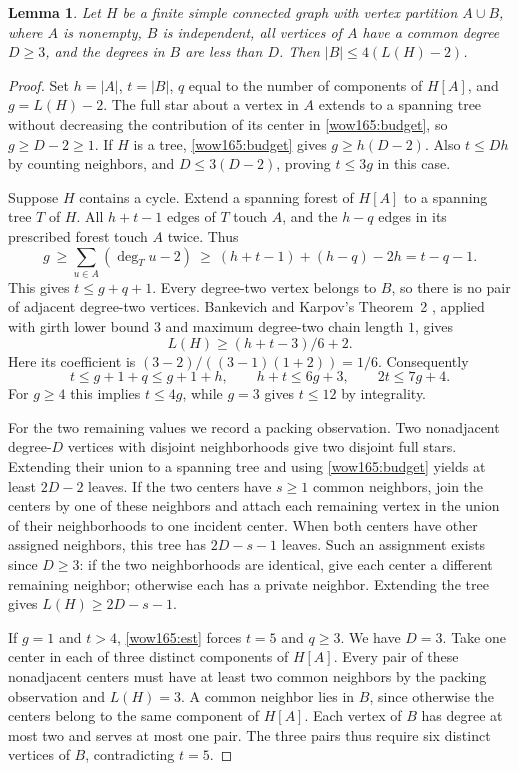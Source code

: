 \documentclass[11pt,a4paper]{article}
\newtheorem{lemma}[theorem]{Lemma}
\numberwithin{equation}{section}
\begin{document}
\begin{lemma}\label{wow165:component}
Let $H$ be a finite simple connected graph with vertex partition
$A\cup B$, where $A$ is nonempty, $B$ is independent, all vertices of
$A$ have a common degree $D\ge3$, and the degrees in $B$ are less than
$D$. Then $|B|\le4(L(H)-2)$.
\end{lemma}
\begin{proof}
Set $h=|A|$, $t=|B|$, $q$ equal to the number of components of $H[A]$,
and $g=L(H)-2$. The full star about a vertex in $A$ extends to a spanning
tree without decreasing the contribution of its center in
\eqref{wow165:budget}, so $g\ge D-2\ge1$. If $H$ is a tree,
\eqref{wow165:budget} gives $g\ge h(D-2)$. Also $t\le Dh$ by counting
neighbors, and $D\le3(D-2)$, proving $t\le3g$ in this case.

Suppose $H$ contains a cycle. Extend a spanning forest of $H[A]$ to
a spanning tree $T$ of $H$. All $h+t-1$ edges of $T$ touch $A$, and
the $h-q$ edges in its prescribed forest touch $A$ twice. Thus
\[
 g\ \ge\sum_{u\in A}(\deg_T u-2)
   \ \ge\ (h+t-1)+(h-q)-2h=t-q-1.
\]
This gives $t\le g+q+1$. Every degree-two vertex belongs to $B$, so
there is no pair of adjacent degree-two vertices. Bankevich and Karpov's
Theorem~2 \cite{wow165:BK}, applied with girth lower bound $3$ and
maximum degree-two chain length $1$, gives
\[
   L(H)\ge (h+t-3)/6+2 .
\]
Here its coefficient is $(3-2)/((3-1)(1+2))=1/6$. Consequently
\begin{equation}\label{wow165:est}
  t\le g+1+q\le g+1+h,\qquad h+t\le6g+3,\qquad 2t\le7g+4 .
\end{equation}
For $g\ge4$ this implies $t\le4g$, while $g=3$ gives $t\le12$ by
integrality.

For the two remaining values we record a packing observation. Two
nonadjacent degree-$D$ vertices with disjoint neighborhoods give two
disjoint full stars. Extending their union to a spanning tree and using
\eqref{wow165:budget} yields at least $2D-2$ leaves. If the two centers
have $s\ge1$ common neighbors, join the centers by one of these
neighbors and attach each remaining vertex in the union of their
neighborhoods to one incident center. When both centers have other
assigned neighbors, this tree has $2D-s-1$ leaves. Such an assignment
exists since $D\ge3$: if the two neighborhoods are identical, give each
center a different remaining neighbor; otherwise each has a private
neighbor. Extending the tree gives $L(H)\ge2D-s-1$.

If $g=1$ and $t>4$, \eqref{wow165:est} forces $t=5$ and $q\ge3$.
We have $D=3$. Take one center in each of three distinct components of
$H[A]$. Every pair of these nonadjacent centers must have at least
two common neighbors by the packing observation and $L(H)=3$.
A common neighbor lies in $B$, since otherwise the centers belong to
the same component of $H[A]$. Each vertex of $B$ has degree at most
two and serves at most one pair. The three pairs thus require six
distinct vertices of $B$, contradicting $t=5$.


\end{proof}
\end{document}

